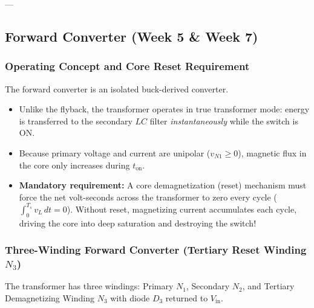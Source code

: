 ---

\subsection{Forward Converter (Week 5 \& Week 7)}

\subsubsection{Operating Concept and Core Reset Requirement}
The forward converter is an isolated buck-derived converter.
\begin{itemize}
  \item Unlike the flyback, the transformer operates in true transformer mode: energy is transferred to the secondary $LC$ filter \emph{instantaneously} while the switch is ON.
  \item Because primary voltage and current are unipolar ($v_{N1} \ge 0$), magnetic flux in the core only increases during $t_{\mathrm{on}}$.
  \item \textbf{Mandatory requirement:} A core demagnetization (reset) mechanism must force the net volt-seconds across the transformer to zero every cycle ($\int_0^{T_s} v_L\, dt = 0$). Without reset, magnetizing current accumulates each cycle, driving the core into deep saturation and destroying the switch!
\end{itemize}

\subsubsection{Three-Winding Forward Converter (Tertiary Reset Winding $N_3$)}
The transformer has three windings: Primary $N_1$, Secondary $N_2$, and Tertiary Demagnetizing Winding $N_3$ with diode $D_3$ returned to $V_{\mathrm{in}}$.

